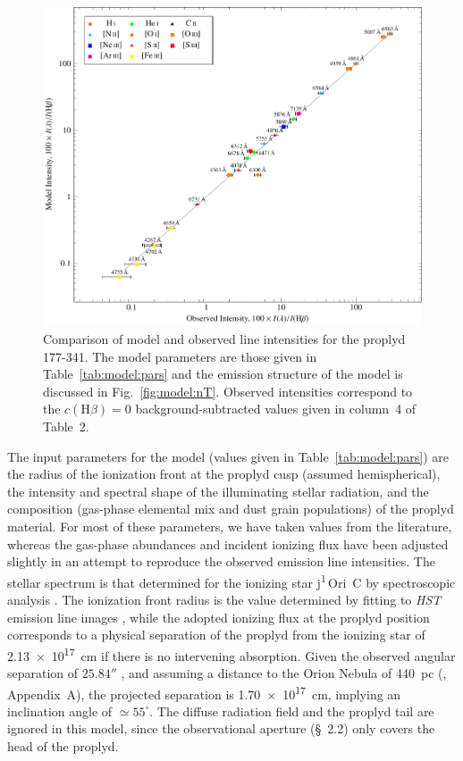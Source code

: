 \documentclass[useAMS,usenatbib]{mn2e}
\newcommand{\texttheta}{\greektext j\latintext}
\newcommand\thC{\texttheta\textsuperscript{1}\,Ori~C}
\begin{document}
\begin{figure}
  \centering
  \includegraphics[width=\linewidth]{ratios-figure-figure10}
  \caption{Comparison of model and observed line intensities for the proplyd 177-341.  The model parameters are those given in Table~\ref{tab:model:pars} and the emission structure of the model is discussed in Fig.~\ref{fig:model:nT}.   
Observed intensities correspond to the \(c(\mathrm{H}\beta) = 0\) background-subtracted values given in column~4 of Table~2.
  }
  \label{fig:model}
\end{figure}


The input parameters for the model (values given in Table~\ref{tab:model:pars}) are the radius of the ionization front at the proplyd cusp (assumed hemispherical), the intensity and spectral shape of the illuminating stellar radiation, and the composition (gas-phase elemental mix and dust grain populations) of the proplyd material.
For most of these parameters, we have taken values from the literature, whereas the gas-phase abundances and incident ionizing flux have been adjusted slightly in an attempt to reproduce the observed emission line intensities. 
The stellar spectrum is that determined for the ionizing star \thC{} by spectroscopic analysis \citep{2006AandA...448..351S}. 
The ionization front radius is the value determined by fitting to \textit{HST} emission line images \citep{1999AJ....118.2350H}, while the adopted ionizing flux at the proplyd position corresponds to a physical separation of the proplyd from the ionizing star of \SI{2.13e17}{cm} if there is no intervening absorption.
Given the observed angular separation of \(25.84''\) \citep{1998AJ....116..293B}, and assuming a distance to the Orion Nebula of 440~pc (\citealp{2008AJ....136.1566O}, Appendix~A), the projected separation is \SI{1.70e17}{cm}, implying an inclination angle of \(\simeq 55^\circ\). 
The diffuse radiation field and the proplyd tail are ignored in this model, since the observational aperture (\S~2.2) only covers the head of the proplyd. 
\end{document}
